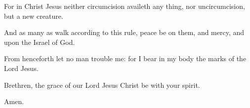 \Verse For in Christ Jesus neither circumcision availeth any thing, nor uncircumcision, but a new creature.

\Verse And as many as walk according to this rule, peace be on them, and mercy, and upon the Israel of God.

\Verse From henceforth let no man trouble me: for I bear in my body the marks of the Lord Jesus.

\Verse Brethren, the grace of our Lord Jesus Christ be with your spirit.

Amen.

